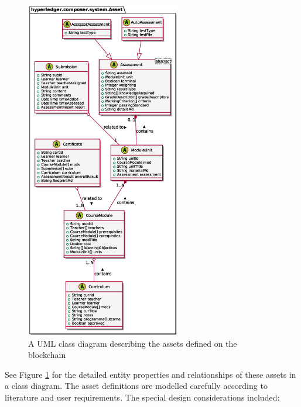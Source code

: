 \begin{figure}[!ht]
	\centering
	\includegraphics[width=0.6\textwidth]{assets}
	\caption[Assets Class Diagram]
	{A UML class diagram describing the assets defined on the blockchain}
	\label{fig:assets}
\end{figure}

See Figure \ref{fig:assets} for the detailed entity properties and relationships of these assets in a class diagram.
The asset definitions are modelled carefully according to literature and user requirements.
The special design considerations included:

